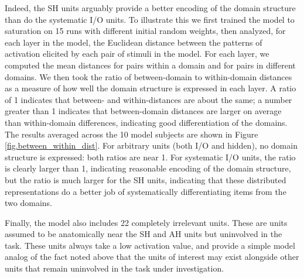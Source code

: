 Indeed, the SH units arguably provide a better encoding of the domain structure than do the systematic I/O units. To illustrate this we first trained the model to saturation on 15 runs with different initial random weights, then analyzed, for each layer in the model, the Euclidean distance between the patterns of activation elicited by each pair of stimuli in the model. For each layer, we computed the mean distances for pairs within a domain and for pairs in different domains. We then took the ratio of between-domain to within-domain distances as a measure of how well the domain structure is expressed in each layer. A ratio of 1 indicates that between- and within-distances are about the same; a number greater than 1 indicates that between-domain distances are larger on average than within-domain differences, indicating good differentiation of the domains. The results averaged across the 10 model subjects are shown in Figure \ref{fig.between_within_dist}. For arbitrary units (both I/O and hidden), no domain structure is expressed: both ratios are near 1. For systematic I/O units, the ratio is clearly larger than 1, indicating reasonable encoding of the domain structure, but the ratio is much larger for the SH units, indicating that these distributed representations do a better job of systematically differentiating items from the two domains.


Finally, the model also includes 22 completely irrelevant units. These are units assumed to be anatomically near the SH and AH units but uninvolved in the task. These units always take a low activation value, and provide a simple model analog of the fact noted above that the units of interest may exist alongside other units that remain uninvolved in the task under investigation.


